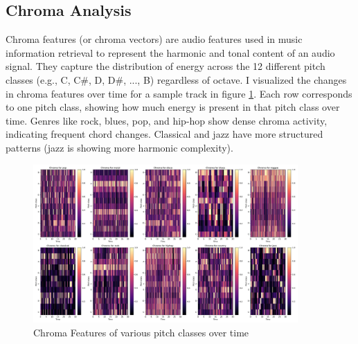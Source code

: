 \documentclass[11.5pt]{article}
\begin{document}
\subsection{Chroma Analysis}
Chroma features (or chroma vectors) are audio features used in music information retrieval to represent the harmonic and tonal content of an audio signal. They capture the distribution of energy across the 12 different pitch classes (e.g., C, C\#, D, D\#, ..., B) regardless of octave. I visualized the changes in chroma features over time for a sample track in figure \ref{fig:chroma}. Each row corresponds to one pitch class, showing how much energy is present in that pitch class over time. Genres like rock, blues, pop, and hip-hop show dense chroma activity, indicating frequent chord changes. Classical and jazz have more structured patterns (jazz is showing more harmonic complexity).
\begin{figure}[h]
    \centering
    \includegraphics[width=0.9\textwidth]{graphics/chroma.pdf}
    \caption{Chroma Features of various pitch classes over time}
    \label{fig:chroma}
\end{figure}
\end{document}
